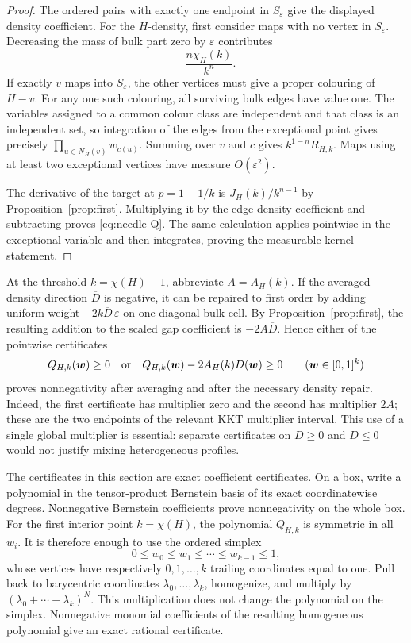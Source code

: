 \documentclass[11pt]{article}
\begin{document}
\begin{proof}
The ordered pairs with exactly one endpoint in $S_\varepsilon$ give the
displayed density coefficient.  For the $H$-density, first consider maps
with no vertex in $S_\varepsilon$.  Decreasing the mass of bulk part zero by
$\varepsilon$ contributes
\[
 -\frac{n\chi_H(k)}{k^n}.
\]
If exactly $v$ maps into $S_\varepsilon$, the other vertices must give a
proper colouring of $H-v$.  For any one such colouring, all surviving bulk
edges have value one.  The variables assigned to a common colour class are
independent and that class is an independent set, so integration of the
edges from the exceptional point gives precisely
$\prod_{u\in N_H(v)}w_{c(u)}$.  Summing over $v$ and $c$ gives
$k^{1-n}R_{H,k}$.  Maps using at least two exceptional vertices have measure
$O(\varepsilon^2)$.

The derivative of the target at $p=1-1/k$ is
$J_H(k)/k^{n-1}$ by Proposition~\ref{prop:first}.  Multiplying it by the
edge-density coefficient and subtracting proves
\eqref{eq:needle-Q}.  The same calculation applies pointwise in the
exceptional variable and then integrates, proving the measurable-kernel
statement.
\end{proof}

At the threshold $k=\chi(H)-1$, abbreviate $A=A_H(k)$.  If the averaged
density direction $\overline D$ is negative, it can be repaired to first
order by adding uniform weight
$-2k\overline D\,\varepsilon$ on one diagonal bulk cell.  By
Proposition~\ref{prop:first}, the resulting addition to the scaled gap
coefficient is $-2A\overline D$.  Hence either of the pointwise certificates
\begin{equation}
 Q_{H,k}(\boldsymbol w)\geq0
 \quad\hbox{or}\quad
 Q_{H,k}(\boldsymbol w)-2A_H(k)D(\boldsymbol w)\geq0
 \qquad(\boldsymbol w\in[0,1]^k)
 \label{eq:needle-threshold-supports}
\end{equation}
proves nonnegativity after averaging and after the necessary density repair.
Indeed, the first certificate has multiplier zero and the second has
multiplier $2A$; these are the two endpoints of the relevant KKT multiplier
interval.  This use of a single global multiplier is essential: separate
certificates on $D\geq0$ and $D\leq0$ would not justify mixing heterogeneous
profiles.

The certificates in this section are exact coefficient certificates.  On a
box, write a polynomial in the tensor-product Bernstein basis of its exact
coordinatewise degrees.  Nonnegative Bernstein coefficients prove
nonnegativity on the whole box.  For the first interior point
$k=\chi(H)$, the polynomial $Q_{H,k}$ is symmetric in all $w_i$.  It is
therefore enough to use the ordered simplex
\[
 0\leq w_0\leq w_1\leq\cdots\leq w_{k-1}\leq1,
\]
whose vertices have respectively $0,1,\ldots,k$ trailing coordinates equal
to one.  Pull back to barycentric coordinates
$\lambda_0,\ldots,\lambda_k$, homogenize, and multiply by
$(\lambda_0+\cdots+\lambda_k)^N$.  This multiplication does not change the
polynomial on the simplex.  Nonnegative monomial coefficients of the
resulting homogeneous polynomial give an exact rational certificate.
\end{document}

